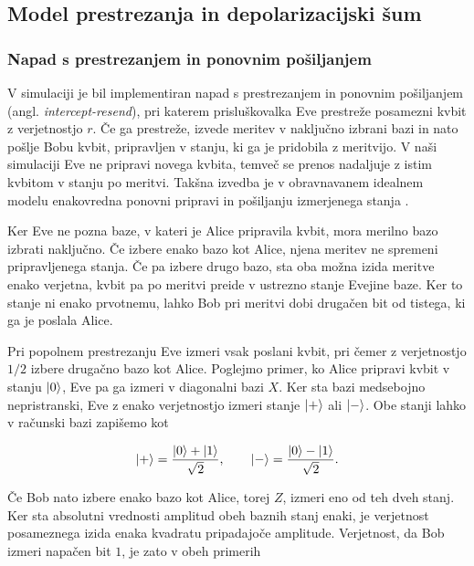 \subsection{Model prestrezanja in depolarizacijski šum}
\label{g22:sec:model}

\subsubsection{Napad s prestrezanjem in ponovnim pošiljanjem}
\label{g22:sec:intercept-resend}

    V simulaciji je bil implementiran napad s prestrezanjem in ponovnim pošiljanjem (angl. \textit{intercept-resend}), pri katerem prisluškovalka Eve prestreže posamezni kvbit z verjetnostjo $r$.
    Če ga prestreže, izvede meritev v naključno izbrani bazi in nato pošlje Bobu kvbit, pripravljen v stanju, ki ga je pridobila z meritvijo. V naši simulaciji Eve ne pripravi novega kvbita, temveč se prenos nadaljuje z istim kvbitom v stanju po meritvi.
    Takšna izvedba je v obravnavanem idealnem modelu enakovredna ponovni pripravi in pošiljanju izmerjenega stanja \cite{g22:mina2020scalable,g22:lee2023detection}.

    Ker Eve ne pozna baze, v kateri je Alice pripravila kvbit,
    mora merilno bazo izbrati naključno. Če izbere enako bazo
    kot Alice, njena meritev ne spremeni pripravljenega stanja.
    Če pa izbere drugo bazo, sta oba možna izida meritve enako
    verjetna, kvbit pa po meritvi preide v ustrezno stanje
    Evejine baze. Ker to stanje ni enako prvotnemu, lahko
    Bob pri meritvi dobi drugačen bit od tistega, ki ga je
    poslala Alice.

    
    Pri popolnem prestrezanju Eve izmeri vsak poslani kvbit,
    pri čemer z verjetnostjo $1/2$ izbere drugačno bazo kot
    Alice. Poglejmo primer, ko Alice pripravi kvbit v stanju
    $\ket{0}$, Eve pa ga izmeri v diagonalni bazi $X$.
    Ker sta bazi medsebojno nepristranski, Eve z enako
    verjetnostjo izmeri stanje $\ket{+}$ ali $\ket{-}$.
    Obe stanji lahko v računski bazi zapišemo kot

    \begin{equation}
        \ket{+} = \frac{\ket{0}+\ket{1}}{\sqrt{2}},
        \qquad
        \ket{-} = \frac{\ket{0}-\ket{1}}{\sqrt{2}}.
    \end{equation}

    Če Bob nato izbere enako bazo kot Alice, torej $Z$,
    izmeri eno od teh dveh stanj. Ker sta absolutni vrednosti
    amplitud obeh baznih stanj enaki, je verjetnost
    posameznega izida enaka kvadratu pripadajoče amplitude.
    Verjetnost, da Bob izmeri napačen bit $1$, je zato
    v obeh primerih

